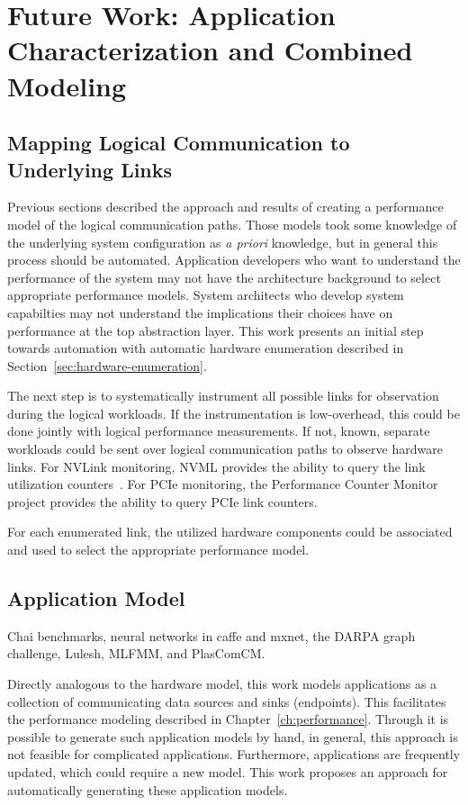 \chapter{Future Work: Application Characterization and Combined Modeling}
\label{ch:future}




\section{Mapping Logical Communication to Underlying Links}

Previous sections described the approach and results of creating a performance model of the logical communication paths.
Those models took some knowledge of the underlying system configuration as \textit{a priori} knowledge, but in general this process should be automated.
Application developers who want to understand the performance of the system may not have the architecture background to select appropriate performance models.
System architects who develop system capabilties may not understand the implications their choices have on performance at the top abstraction layer.
This work presents an initial step towards automation with automatic hardware enumeration described in Section~\ref{sec:hardware-enumeration}.

The next step is to systematically instrument all possible links for observation during the logical workloads.
If the instrumentation is low-overhead, this could be done jointly with logical performance measurements.
If not, known, separate workloads could be sent over logical communication paths to observe hardware links.
For NVLink monitoring, NVML provides the ability to query the link utilization counters~\cite{nvidia2017nvmlreference}.
For PCIe monitoring, the Performance Counter Monitor~\cite{opcm2018pcm} project provides the ability to query PCIe link counters.

For each enumerated link, the utilized hardware components could be associated and used to select the appropriate performance model.

\section{Application Model}

Chai benchmarks, neural networks in caffe and mxnet, the DARPA graph challenge, Lulesh, MLFMM, and PlasComCM.

Directly analogous to the hardware model, this work models applications as a collection of communicating data sources and sinks (endpoints).
This facilitates the performance modeling described in Chapter~\ref{ch:performance}.
Through it is possible to generate such application models by hand, in general, this approach is not feasible for complicated applications.
Furthermore, applications are frequently updated, which could require a new model.
This work proposes an approach for automatically generating these application models.

